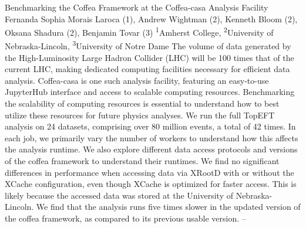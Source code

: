 \makeabstract
{
Benchmarking the Coffea Framework at the Coffea-casa Analysis Facility
}
{
Fernanda Sophia Morais Laroca (1), Andrew Wightman (2), Kenneth Bloom (2), Oksana Shadura (2), Benjamin Tovar (3)
}
{
\textsuperscript{1}Amherst College, \textsuperscript{2}University of Nebraska-Lincoln, \textsuperscript{3}University of Notre Dame
}
{
The volume of data generated by the  High-Luminosity Large Hadron Collider (LHC) will be 100 times that of the current LHC, making dedicated computing facilities necessary for efficient data analysis. Coffea-casa is one such analysis facility, featuring an easy-to-use JupyterHub interface and access to scalable computing resources. Benchmarking the scalability of computing resources is essential to understand how to best utilize these resources for future physics analyses.
}
{
We run the full TopEFT analysis on 24 datasets, comprising over 80 million events, a total of 42 times. In each job, we primarily vary the number of workers to understand how this affects the analysis runtime. We also explore different data access protocols and versions of the coffea framework to understand their runtimes.
}
{
We find no significant differences in performance when accessing data via XRootD with or without the XCache configuration, even though XCache is optimized for faster access. This is likely because the accessed data was stored at the University of Nebraska-Lincoln. We find that the analysis runs five times slower in the updated version of the coffea framework, as compared to its previous usable version. 
}
{
--
}

\newpage
